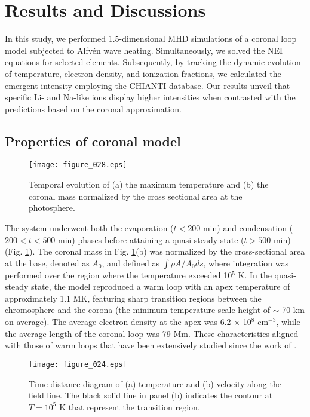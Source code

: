 \documentclass[fleqn,usenatbib]{mnras}
\begin{document}
\section{Results and Discussions}
In this study, we performed 1.5-dimensional MHD simulations of a coronal loop model subjected to Alfv\'{e}n wave heating. Simultaneously, we solved the NEI equations for selected elements. Subsequently, by tracking the dynamic evolution of temperature, electron density, and ionization fractions, we calculated the emergent intensity employing the CHIANTI database. Our results unveil that specific Li- and Na-like ions display higher intensities when contrasted with the predictions based on the coronal approximation.

\subsection{Properties of coronal model}

\begin{figure}
	\texttt{[image: figure\_028.eps]}
    \caption{Temporal evolution of (a) the maximum temperature and (b) the coronal mass normalized by the cross sectional area at the photosphere.}
    \label{fig:time_evolution}
\end{figure}

The system underwent both the evaporation ($t<200$ min) and condensation ($200<t<500$ min) phases before attaining a quasi-steady state ($t>500$ min) (Fig. \ref{fig:time_evolution}). 
The coronal mass in Fig. \ref{fig:time_evolution}(b) was normalized by the cross-sectional area at the base, denoted as $A_0$, and defined as $\int \rho A/A_0 ds$, where integration was performed over the region where the temperature exceeded 10$^5$ K.
In the quasi-steady state, the model reproduced a warm loop with an apex temperature of approximately 1.1 MK, featuring sharp transition regions between the chromosphere and the corona (the minimum temperature scale height of $\sim$ 70 km on average).
The average electron density at the apex was 6.2 $\times$ 10$^8$ cm$^{-3}$, while the average length of the coronal loop was 79 Mm. 
These characteristics aligned with those of warm loops that have been extensively studied since the work of \cite{1999ApJ...515..842A}. 

\begin{figure}
	\texttt{[image: figure\_024.eps]}
    \caption{Time distance diagram of (a) temperature and (b) velocity along the field line.
    The black solid line in panel (b) indicates the contour at $T = 10^5$ K that represent the transition region.}
    \label{fig:td_diagram}
\end{figure}
\end{document}
